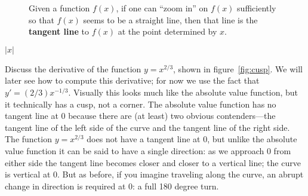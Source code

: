\begin{figure*}
\caption{Given a function $f(x)$, if one can ``zoom in''
on $f(x)$ sufficiently so that $f(x)$ seems to be a straight line,
then that line is the \textbf{tangent line} to $f(x)$ at the point
determined by $x$.}
\label{figure:informal-tangent}
\end{figure*}

\begin{example}
$|x|$
\end{example}


\begin{example}
Discuss the derivative of the function $y=x^{2/3}$, shown in
figure~\ref{fig:cusp}. We will later see how to compute this
derivative; for now we use the fact that $
y'=(2/3)x^{-1/3}$. Visually this looks much like the absolute value
function, but it technically has a cusp, not a corner. The absolute
value function has no tangent line at 0 because there are (at least)
two obvious contenders---the tangent line of the left side of the
curve and the tangent line of the right side.  The function $
y=x^{2/3}$ does not have a tangent line at 0, but unlike the absolute
value function it can be said to have a single direction: as we
approach 0 from either side the tangent line becomes closer and closer
to a vertical line; the curve is vertical at 0. But as before, if you
imagine traveling along the curve, an abrupt change in direction is
required at 0: a full 180 degree turn.
\end{example}



